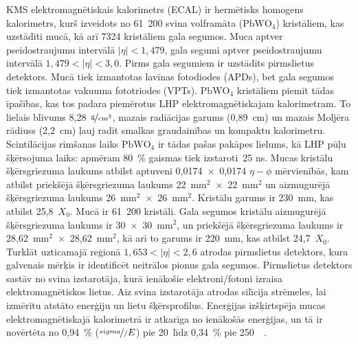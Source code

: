 KMS elektromagnētiskais kalorimetrs (ECAL) ir hermētisks homogens kalorimetrs, kurš izveidots no 61~200 svina volframāta ($\text{PbWO}_{4}$) kristāliem, kas uzstādīti mucā, kā arī \num{7324} kristāliem gala segumos. Muca aptver pseido\gls{straujumu} intervālā $\left|\eta\right|<1,479$, gala segumi aptver pseidostraujumu intervālā $1,479<\left|\eta\right|<3,0$. Pirms gala segumiem ir uzstādīts pirmslietus detektors. Mucā tiek izmantotas lavīnas fotodiodes (APDs), bet gala segumos tiek izmantotas vakuuma fototriodes (VPTs). $\text{PbWO}_{4}$ kristāliem piemīt tādas īpašības, kas tos padara piemērotus LHP elektromagnētiskajam kalorimetram. To lielais blīvums 8,28~$\nicefrac{\text{g}}{\text{cm}^3}$, mazais radiācijas garums (0,89~cm) un mazais Moljēra rādiuss (2,2~cm) ļauj radīt smalkas graudainības un kompaktu kalorimetru. Scintilācijas rimšanas laiks $\text{PbWO}_{4}$ ir tādas pašas pakāpes lielums, kā LHP pūļu šķērsojuma laiks: apmēram 80~\% gaismas tiek izstaroti~25 ns. Mucas kristālu šķērsgriezuma laukums atbilst aptuveni 0,0174~$\times$~0,0174 $\eta-\phi$ mērvienībās, kam atbilst priekšējā šķērsgriezuma laukums 22~$\text{mm}^2$~$\times$~22~$\text{mm}^2$ un aizmugurējā šķērsgriezuma laukums 26~$\text{mm}^2$~$\times$~26~$\text{mm}^2$. Kristālu garums ir 230~mm, kas atbilst 25,8~$X_{0}$. Mucā ir 61~200 kristāli. Gala segumos kristālu aizmugurējā šķērsgriezuma laukums ir 30~$\times$~30~$\text{mm}^2$, un priekšējā šķērsgriezuma laukums ir 28,62~$\text{mm}^2$~$\times$~28,62~$\text{mm}^2$, kā arī to garums ir 220~mm, kas atbilst 24,7~$X_{0}$. Turklāt \gls{uzticamajā reģionā} $1,653<\left|\eta\right|<2,6$ atrodas pirmslietus detektors, kura galvenais mērķis ir identificēt neitrālos pionus gala segumos. Pirmslietus detektors sastāv no svina izstarotāja, kurā ienākošie elektroni/fotoni izraisa elektromagnētiskos lietus. Aiz svina izstarotāja atrodas silīcija strēmeles, lai izmērītu atstāto enerģiju un lietu šķērsprofilus. Enerģijas izšķirtspēja mucas elektromagnētiskajā kalorimetrā ir atkarīga no ienākošās enerģijas, un tā ir novērtēta no 0,94~\% ($\nicefrac{sigma}/{E}$) pie 20~\GeV līdz 0,34~\% pie 250~\GeV~\cite{Adzic:2007mi}. 

